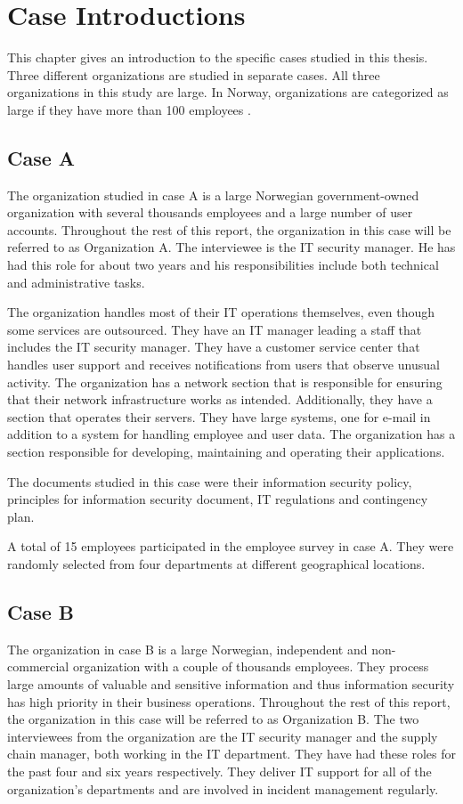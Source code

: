 \chapter{Case Introductions}
\label{chp:CaseIntroductions}
This chapter gives an introduction to the specific cases studied in this thesis. Three  different organizations are studied in separate cases. All three organizations in this study are large. In Norway, organizations are categorized as large if they have more than 100 employees \cite{SMB}. 

\section{Case A}
The organization studied in case A is a large Norwegian government-owned organization with several thousands employees and a large number of user accounts. Throughout the rest of this report, the organization in this case will be referred to as Organization A. The interviewee is the IT security manager. He has had this role for about two years and his responsibilities include both technical and administrative tasks. 

The organization handles most of their IT operations themselves, even though some services are outsourced. They have an IT manager leading a staff that includes the IT security manager. They have a customer service center that handles user support and receives notifications from users that observe unusual activity. The organization has a network section that is responsible for ensuring that their network infrastructure works as intended. Additionally, they have a section that operates their servers. They have large systems, one for e-mail in addition to a system for handling employee and user data. The organization has a section responsible for developing, maintaining and operating their applications.

The documents studied in this case were their information security policy, principles for information security document, IT regulations and contingency plan.

A total of 15 employees participated in the employee survey in case A. They were randomly selected from four departments at different geographical locations. 

\section{Case B}
The organization in case B is a large Norwegian, independent and non-commercial organization with a couple of thousands employees. They process large amounts of valuable and sensitive information and thus information security has high priority in their business operations. Throughout the rest of this report, the organization in this case will be referred to as Organization B. The two interviewees from the organization are the IT security manager and the supply chain manager, both working in the IT department. They have had these roles for the past four and six years respectively. They deliver IT support for all of the organization's departments and are involved in incident management regularly.   

